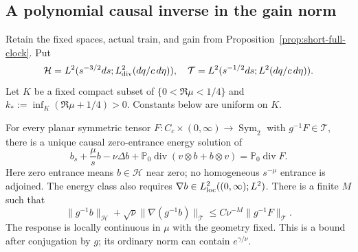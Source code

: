 \subsection{A polynomial causal inverse in the gain norm}
\label{sec:short-polynomial-causal}

Retain the fixed spaces, actual train, and gain from
Proposition~\ref{prop:short-full-clock}. Put
\[
 \mathcal H=L^2(s^{-3/2}ds;L^2_{\rm div}(dq/c\,d\eta)),\quad
 \mathcal T=L^2(s^{-1/2}ds;L^2(dq/c\,d\eta)).
\]
Let $K$ be a fixed compact subset of $\{0<\Re\mu<1/4\}$ and
$k_*:=\inf_K(\Re\mu+1/4)>0$. Constants below are uniform on $K$.

\begin{proposition}\label{prop:short-polynomial-causal}
For every planar symmetric tensor $F:C_c\times(0,\infty)\to
\operatorname{Sym}_2$ with $g^{-1}F\in\mathcal T$, there is
a unique causal zero-entrance energy solution of
\begin{equation}\label{eq:short-causal-equation}
 b_s+\frac\mu s b-\nu\Delta b+\mathbb P_0\operatorname{div}
       (v\otimes b+b\otimes v)=\mathbb P_0\operatorname{div}F.
\end{equation}
Here zero entrance means $b\in\mathcal H$ near zero; no homogeneous
$s^{-\mu}$ entrance is adjoined. The energy class also requires
$\nabla b\in L^2_{\rm loc}((0,\infty);L^2)$. There is a finite
$M$ such that
\begin{equation}\label{eq:short-causal-bound}
 \|g^{-1}b\|_{\mathcal H}
 +\sqrt\nu\|\nabla(g^{-1}b)\|_{\mathcal T}
 \le C\nu^{-M}\|g^{-1}F\|_{\mathcal T}.
\end{equation}
The response is locally continuous in $\mu$ with the geometry fixed.
This is a bound after conjugation by $g$; its ordinary norm can contain
$e^{\gamma/\nu}$.
\end{proposition}

